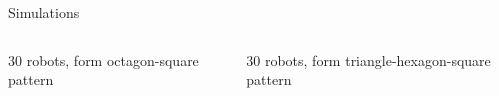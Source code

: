 \begin{frame}{Simulations}
  \begin{columns}
    \begin{column}{.45\textwidth}
      30 robots, form octagon-square pattern
       \begin{center}
       \end{center}
    \end{column}
    \begin{column}{.45\textwidth}
      30 robots, form triangle-hexagon-square pattern
       \begin{center}
       \end{center}
    \end{column}
  \end{columns}
\end{frame}

